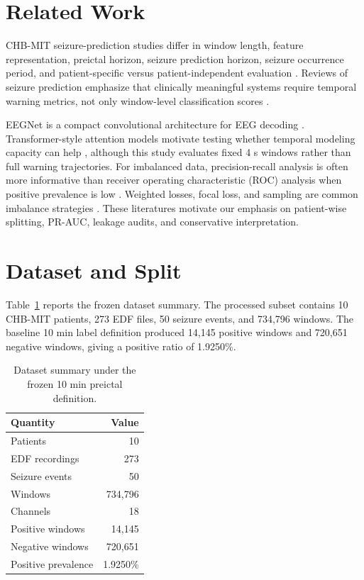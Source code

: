 \documentclass[10pt,conference]{IEEEtran}
\begin{document}
\section{Related Work}
CHB-MIT seizure-prediction studies differ in window length, feature representation, preictal horizon, seizure prediction horizon, seizure occurrence period, and patient-specific versus patient-independent evaluation \cite{truong2018cnn,dissanayake2020patientindependent,koutsouvelis2024preictal}. Reviews of seizure prediction emphasize that clinically meaningful systems require temporal warning metrics, not only window-level classification scores \cite{mormann2007seizure,kuhlmann2018seizure}.

EEGNet is a compact convolutional architecture for EEG decoding \cite{lawhern2018eegnet}. Transformer-style attention models motivate testing whether temporal modeling capacity can help \cite{vaswani2017attention}, although this study evaluates fixed 4 s windows rather than full warning trajectories. For imbalanced data, precision-recall analysis is often more informative than receiver operating characteristic (ROC) analysis when positive prevalence is low \cite{davis2006relationship,saito2015precision}. Weighted losses, focal loss, and sampling are common imbalance strategies \cite{lin2017focal,buda2018systematic}. These literatures motivate our emphasis on patient-wise splitting, PR-AUC, leakage audits, and conservative interpretation.

\section{Dataset and Split}
Table~\ref{tab:dataset} reports the frozen dataset summary. The processed subset contains 10 CHB-MIT patients, 273 EDF files, 50 seizure events, and 734,796 windows. The baseline 10 min label definition produced 14,145 positive windows and 720,651 negative windows, giving a positive ratio of 1.9250\%.

\begin{table}[t]
\centering
\caption{Dataset summary under the frozen 10 min preictal definition.}
\label{tab:dataset}
\begin{tabular}{lr}
\toprule
Quantity & Value \\
\midrule
Patients & 10 \\
EDF recordings & 273 \\
Seizure events & 50 \\
Windows & 734,796 \\
Channels & 18 \\
Positive windows & 14,145 \\
Negative windows & 720,651 \\
Positive prevalence & 1.9250\% \\
\bottomrule
\end{tabular}
\end{table}
\end{document}

